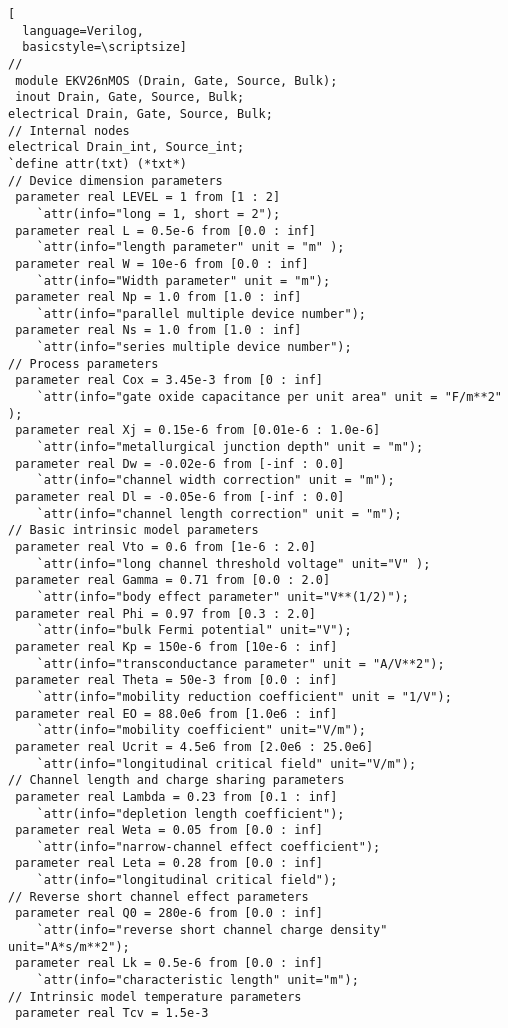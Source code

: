 \begin{lstlisting}[
  language=Verilog,
  basicstyle=\scriptsize]
// 
 module EKV26nMOS (Drain, Gate, Source, Bulk);
 inout Drain, Gate, Source, Bulk;
electrical Drain, Gate, Source, Bulk;
// Internal nodes
electrical Drain_int, Source_int;
`define attr(txt) (*txt*)
// Device dimension parameters
 parameter real LEVEL = 1 from [1 : 2]  
	`attr(info="long = 1, short = 2");
 parameter real L = 0.5e-6 from [0.0 : inf]  
	`attr(info="length parameter" unit = "m" );
 parameter real W = 10e-6 from [0.0 : inf]  
	`attr(info="Width parameter" unit = "m"); 
 parameter real Np = 1.0 from [1.0 : inf]   
	`attr(info="parallel multiple device number");
 parameter real Ns = 1.0 from [1.0 : inf] 
	`attr(info="series multiple device number"); 
// Process parameters
 parameter real Cox = 3.45e-3 from [0 : inf]         
	`attr(info="gate oxide capacitance per unit area" unit = "F/m**2" );
 parameter real Xj = 0.15e-6 from [0.01e-6 : 1.0e-6] 
	`attr(info="metallurgical junction depth" unit = "m");
 parameter real Dw = -0.02e-6 from [-inf : 0.0]      
	`attr(info="channel width correction" unit = "m");
 parameter real Dl = -0.05e-6 from [-inf : 0.0]       
	`attr(info="channel length correction" unit = "m");
// Basic intrinsic model parameters
 parameter real Vto = 0.6 from [1e-6 : 2.0]         
	`attr(info="long channel threshold voltage" unit="V" );
 parameter real Gamma = 0.71 from [0.0 : 2.0]       
	`attr(info="body effect parameter" unit="V**(1/2)");
 parameter real Phi = 0.97 from [0.3 : 2.0]         
	`attr(info="bulk Fermi potential" unit="V");
 parameter real Kp = 150e-6 from [10e-6 : inf]      
	`attr(info="transconductance parameter" unit = "A/V**2");
 parameter real Theta = 50e-3 from [0.0 : inf]      
	`attr(info="mobility reduction coefficient" unit = "1/V");
 parameter real EO = 88.0e6 from [1.0e6 : inf]      
	`attr(info="mobility coefficient" unit="V/m");
 parameter real Ucrit = 4.5e6 from [2.0e6 : 25.0e6] 
	`attr(info="longitudinal critical field" unit="V/m");
// Channel length and charge sharing parameters
 parameter real Lambda = 0.23 from [0.1 : inf]      
	`attr(info="depletion length coefficient");
 parameter real Weta = 0.05 from [0.0 : inf]        
	`attr(info="narrow-channel effect coefficient");
 parameter real Leta = 0.28 from [0.0 : inf]        
	`attr(info="longitudinal critical field");
// Reverse short channel effect parameters
 parameter real Q0 = 280e-6 from [0.0 : inf]        
	`attr(info="reverse short channel charge density" unit="A*s/m**2");
 parameter real Lk = 0.5e-6 from [0.0 : inf]        
	`attr(info="characteristic length" unit="m");
// Intrinsic model temperature parameters
 parameter real Tcv = 1.5e-3   

\end{lstlisting}
